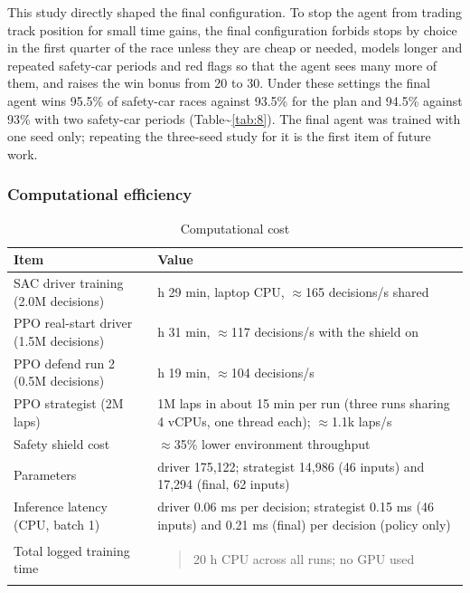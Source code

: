 \documentclass{ieeeaccess}
\begin{document}
This study directly shaped the final configuration. To stop the agent from trading
track position for small time gains, the final configuration forbids stops by
choice in the first quarter of the race unless they are cheap or needed, models
longer and repeated safety-car periods and red flags so that the agent sees many
more of them, and raises the win bonus from 20 to 30. Under these settings the
final agent wins 95.5\% of safety-car races against 93.5\% for the plan and 94.5\%
against 93\% with two safety-car periods (Table\textasciitilde{}\ref{tab:8}). The final agent was trained
with one seed only; repeating the three-seed study for it is the first item of
future work.

\subsubsection{Computational efficiency}

\begin{table}[!t]
\caption{Computational cost}
\label{tab:11}
\centering\footnotesize
\begin{tabularx}{\columnwidth}{>{\raggedright\arraybackslash}X>{\raggedright\arraybackslash}X}
\hline
\textbf{Item} & \textbf{Value} \\
\hline
SAC driver training (2.0M decisions) & 3 h 29 min, laptop CPU, \ensuremath{\approx}165 decisions/s shared \\
PPO real-start driver (1.5M decisions) & 3 h 31 min, \ensuremath{\approx}117 decisions/s with the shield on \\
PPO defend run 2 (0.5M decisions) & 1 h 19 min, \ensuremath{\approx}104 decisions/s \\
PPO strategist (2M laps) & 1M laps in about 15 min per run (three runs sharing 4 vCPUs, one thread each); \ensuremath{\approx}1.1k laps/s \\
Safety shield cost & \ensuremath{\approx}35\% lower environment throughput \\
Parameters & driver 175,122; strategist 14,986 (46 inputs) and 17,294 (final, 62 inputs) \\
Inference latency (CPU, batch 1) & driver 0.06 ms per decision; strategist 0.15 ms (46 inputs) and 0.21 ms (final) per decision (policy only) \\
Total logged training time & \begin{quote}
20 h CPU across all runs; no GPU used
\end{quote} \\
\hline
\end{tabularx}
\end{table}
\end{document}
